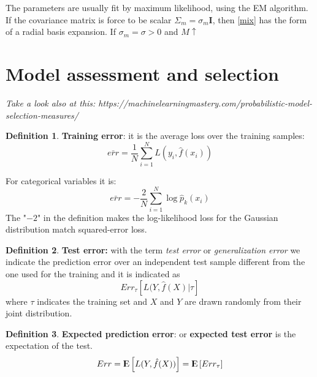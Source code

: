 \documentclass[12pt, letterpaper]{article}
\theoremstyle{definition}
\newtheorem{definition}{Definition}[section]
\newcommand{\E}{{\rm I\kern-.3em E}}
\newcommand{\I}{\mathrm{\mathbf{I}}}
\begin{document}
The parameters are usually fit by maximum likelihood, using the EM algorithm. If the covariance matrix is force to be scalar $\Sigma_m = \sigma_m \I$, then \autoref{mix} has the form of a radial basis expansion. If $\sigma_m = \sigma >0$ and $M \uparrow $

\newpage
\section{Model assessment and selection}
\textit{Take a look also at this: https://machinelearningmastery.com/probabilistic-model-selection-measures/}
\begin{definition}{\textbf{Training error}}: it is the average loss over the training samples:
\begin{equation}
\bar{err} = \frac{1}{N}\sum_{i=1}^N L(y_i, \hat{f}(x_i))
\end{equation}

For categorical variables it is:
\begin{equation}
\bar{err}  = -\frac{2}{N} \sum_{i=1}^N \log\hat{p}_k(x_i)
\end{equation}
The "$-2$" in the definition makes the log-likelihood loss for the Gaussian distribution match squared-error loss.
\label{trainErr}
\end{definition}

\begin{definition}{\textbf{Test error:}} with  the term \textit{test error} or \textit{generalization error} we indicate the prediction error over an independent test sample different from the one used for the training and it is indicated as 
\begin{equation}
Err_\tau \left[L(Y,\hat{f}(X)|\tau\right]
\end{equation}
where $\tau$ indicates the training set and $X$ and $Y$ are drawn randomly from their joint distribution.
\end{definition}

\begin{definition}{\textbf{Expected prediction error}}: or \textbf{expected test error} is the expectation of the test.
\begin{equation}
Err = \E\left[ L(Y,\hat{f}(X))\right] =  \E\left[Err_\tau\right]
\end{equation}
\end{definition}
\end{document}
